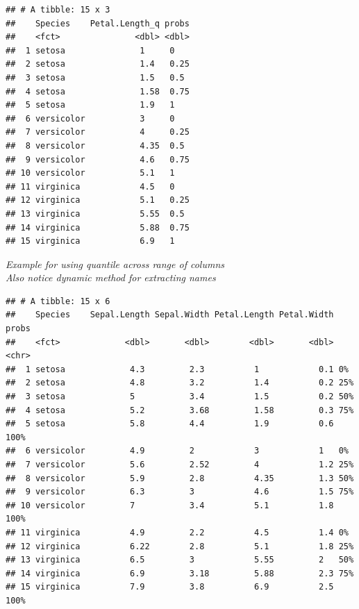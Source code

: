 \documentclass[]{book}
\newenvironment{Shaded}{\begin{snugshade}}{\end{snugshade}}
\newcommand{\DataTypeTok}[1]{\textcolor[rgb]{0.13,0.29,0.53}{#1}}
\newcommand{\KeywordTok}[1]{\textcolor[rgb]{0.13,0.29,0.53}{\textbf{#1}}}
\newcommand{\NormalTok}[1]{#1}
\newcommand{\OperatorTok}[1]{\textcolor[rgb]{0.81,0.36,0.00}{\textbf{#1}}}
\newcommand{\StringTok}[1]{\textcolor[rgb]{0.31,0.60,0.02}{#1}}
\theoremstyle{definition}
\theoremstyle{definition}
\theoremstyle{definition}
\theoremstyle{remark}
\begin{document}
\begin{verbatim}
## # A tibble: 15 x 3
##    Species    Petal.Length_q probs
##    <fct>               <dbl> <dbl>
##  1 setosa               1     0   
##  2 setosa               1.4   0.25
##  3 setosa               1.5   0.5 
##  4 setosa               1.58  0.75
##  5 setosa               1.9   1   
##  6 versicolor           3     0   
##  7 versicolor           4     0.25
##  8 versicolor           4.35  0.5 
##  9 versicolor           4.6   0.75
## 10 versicolor           5.1   1   
## 11 virginica            4.5   0   
## 12 virginica            5.1   0.25
## 13 virginica            5.55  0.5 
## 14 virginica            5.88  0.75
## 15 virginica            6.9   1
\end{verbatim}

\emph{Example for using quantile across range of columns}\\
\emph{Also notice dynamic method for extracting names}

\begin{Shaded}
\end{Shaded}

\begin{verbatim}
## # A tibble: 15 x 6
##    Species    Sepal.Length Sepal.Width Petal.Length Petal.Width probs
##    <fct>             <dbl>       <dbl>        <dbl>       <dbl> <chr>
##  1 setosa             4.3         2.3          1            0.1 0%   
##  2 setosa             4.8         3.2          1.4          0.2 25%  
##  3 setosa             5           3.4          1.5          0.2 50%  
##  4 setosa             5.2         3.68         1.58         0.3 75%  
##  5 setosa             5.8         4.4          1.9          0.6 100% 
##  6 versicolor         4.9         2            3            1   0%   
##  7 versicolor         5.6         2.52         4            1.2 25%  
##  8 versicolor         5.9         2.8          4.35         1.3 50%  
##  9 versicolor         6.3         3            4.6          1.5 75%  
## 10 versicolor         7           3.4          5.1          1.8 100% 
## 11 virginica          4.9         2.2          4.5          1.4 0%   
## 12 virginica          6.22        2.8          5.1          1.8 25%  
## 13 virginica          6.5         3            5.55         2   50%  
## 14 virginica          6.9         3.18         5.88         2.3 75%  
## 15 virginica          7.9         3.8          6.9          2.5 100%
\end{verbatim}
\end{document}
